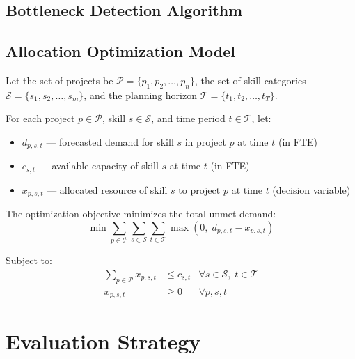 \subsection{Bottleneck Detection Algorithm}

\subsection{Allocation Optimization Model}

Let the set of projects be $\mathcal{P} = \{p_1, p_2, \ldots, p_n\}$, the set of skill categories $\mathcal{S} = \{s_1, s_2, \ldots, s_m\}$, and the planning horizon $\mathcal{T} = \{t_1, t_2, \ldots, t_T\}$.

\noindent For each project $p \in \mathcal{P}$, skill $s \in \mathcal{S}$, and time period $t \in \mathcal{T}$, let:
\begin{itemize}
  \item $d_{p,s,t}$ — forecasted demand for skill $s$ in project $p$ at time $t$ (in FTE)
  \item $c_{s,t}$ — available capacity of skill $s$ at time $t$ (in FTE)
  \item $x_{p,s,t}$ — allocated resource of skill $s$ to project $p$ at time $t$ (decision variable)
\end{itemize}

\noindent The optimization objective minimizes the total unmet demand:
\begin{equation}
  \min \sum_{p \in \mathcal{P}} \sum_{s \in \mathcal{S}} \sum_{t \in \mathcal{T}} \max(0,\; d_{p,s,t} - x_{p,s,t})
  \label{eq:objective}
\end{equation}

\noindent Subject to:
\begin{align}
  \sum_{p \in \mathcal{P}} x_{p,s,t} &\leq c_{s,t} & \forall s \in \mathcal{S},\; t \in \mathcal{T} \label{eq:capacity} \\
  x_{p,s,t} &\geq 0 & \forall p, s, t \label{eq:nonnegativity}
\end{align}


\section{Evaluation Strategy}
\label{sec:evaluation_strategy}

